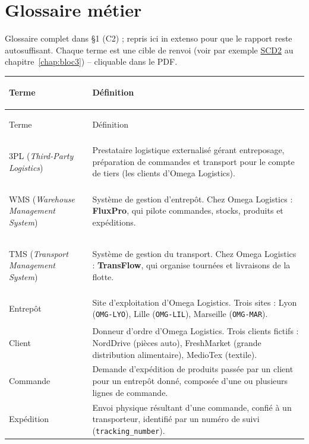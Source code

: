 \chapter{Glossaire métier}
\label{annexe:glossaire}

Glossaire complet dans 
\S{}1 (C2) ; repris ici in extenso pour que le rapport reste
autosuffisant. Chaque terme est une cible de renvoi (voir par exemple
\hyperref[gloss:scd2]{SCD2} au chapitre~\ref{chap:bloc3}) --
cliquable dans le PDF.

\begin{longtable}{@{}>{\bfseries\raggedright}p{3.4cm} p{12.2cm}@{}}
\toprule
Terme & Définition \\
\midrule
\endfirsthead
\toprule
Terme & Définition \\
\midrule
\endhead
\bottomrule
\endfoot

\label{gloss:3pl}3PL (\textit{Third-Party Logistics}) &
Prestataire logistique externalisé gérant entreposage, préparation de
commandes et transport pour le compte de tiers (les clients d'Omega
Logistics). \\

\label{gloss:wms}WMS (\textit{Warehouse Management System}) &
Système de gestion d'entrepôt. Chez Omega Logistics : \textbf{FluxPro},
qui pilote commandes, stocks, produits et expéditions. \\

\label{gloss:tms}TMS (\textit{Transport Management System}) &
Système de gestion du transport. Chez Omega Logistics :
\textbf{TransFlow}, qui organise tournées et livraisons de la flotte. \\

\label{gloss:entrepot}Entrepôt &
Site d'exploitation d'Omega Logistics. Trois sites : Lyon
(\texttt{OMG-LYO}), Lille (\texttt{OMG-LIL}), Marseille
(\texttt{OMG-MAR}). \\

\label{gloss:client}Client &
Donneur d'ordre d'Omega Logistics. Trois clients fictifs : NordDrive
(pièces auto), FreshMarket (grande distribution alimentaire), MedioTex
(textile). \\

\label{gloss:commande}Commande &
Demande d'expédition de produits passée par un client pour un entrepôt
donné, composée d'une ou plusieurs lignes de commande. \\

\label{gloss:expedition}Expédition &
Envoi physique résultant d'une commande, confié à un transporteur,
identifié par un numéro de suivi (\texttt{tracking\_number}). \\


\end{longtable}
